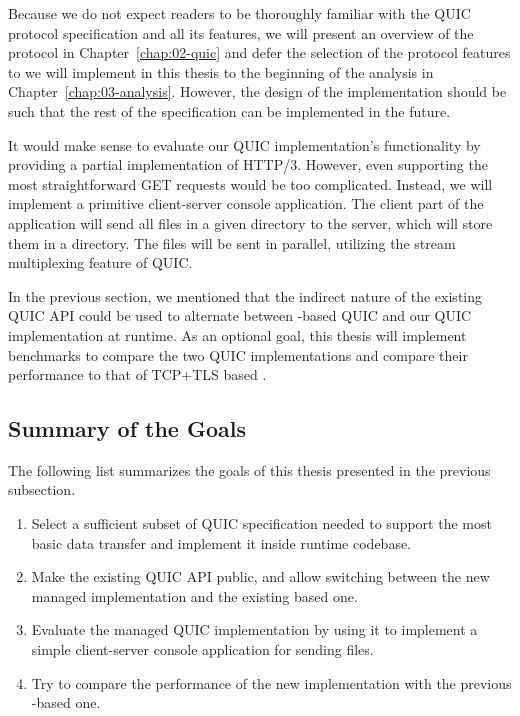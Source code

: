 Because we do not expect readers to be thoroughly familiar with the QUIC protocol specification and
all its features, we will present an overview of the protocol in Chapter~\ref{chap:02-quic} and
defer the selection of the protocol features to we will implement in this thesis to the beginning of
the analysis in Chapter~\ref{chap:03-analysis}. However, the design of the implementation should be
such that the rest of the specification can be implemented in the future.

It would make sense to evaluate our QUIC implementation's functionality by providing a partial
implementation of HTTP/3. However, even supporting the most straightforward GET requests would be
too complicated. Instead, we will implement a primitive client-server console application. The
client part of the application will send all files in a given directory to the server, which will
store them in a directory. The files will be sent in parallel, utilizing the stream multiplexing
feature of QUIC\@.

In the previous section, we mentioned that the indirect nature of the existing QUIC API could be
used to alternate between \libmsquic{}-based QUIC and our QUIC implementation at runtime. As an
optional goal, this thesis will implement benchmarks to compare the two QUIC implementations and
compare their performance to that of TCP+TLS based .

\subsection*{Summary of the Goals}


The following list summarizes the goals of this thesis presented in the previous subsection.

\begin{enumerate}

  \item Select a sufficient subset of QUIC specification needed to support the most basic data
    transfer and implement it inside \dotnet{} runtime codebase.

  \item Make the existing QUIC API public, and allow switching between the new managed
    implementation and the existing \libmsquic{} based one. 

  \item Evaluate the managed QUIC implementation by using it to implement a simple client-server
    console application for sending files.

  \item {} Try to compare the performance of the new
    implementation with the previous \libmsquic{}-based one.

\end{enumerate}
